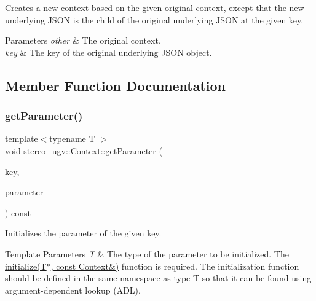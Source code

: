 Creates a new context based on the given original context, except that the new underlying J\+S\+ON is the child of the original underlying J\+S\+ON at the given key. 


\begin{DoxyParams}{Parameters}
{\em other} & The original context. \\
\hline
{\em key} & The key of the original underlying J\+S\+ON object. \\
\hline
\end{DoxyParams}


\subsection{Member Function Documentation}
\mbox{\label{classstereo__ugv_1_1Context_a1996f3d3213ab26a3ba84a1c0cf7b62e}} 
\subsubsection{\texorpdfstring{get\+Parameter()}{getParameter()}\hspace{0.1cm}{\footnotesize\ttfamily [1/2]}}
{\footnotesize\ttfamily template$<$typename T $>$ \\
void stereo\+\_\+ugv\+::\+Context\+::get\+Parameter (\begin{DoxyParamCaption}\item[{const std\+::string \&}]{key,  }\item[{T $\ast$}]{parameter }\end{DoxyParamCaption}) const\hspace{0.3cm}{\ttfamily [inline]}}



Initializes the parameter of the given key. 


\begin{DoxyTemplParams}{Template Parameters}
{\em T} & The type of the parameter to be initialized. The \hyperlink{namespacestereo__ugv_a6971cc11001fdf589a71f6fb3099c65b}{initialize(\+T$\ast$, const Context\&)} function is required. The initialization function should be defined in the same namespace as type T so that it can be found using argument-\/dependent lookup (A\+DL). \\
\hline
\end{DoxyTemplParams}

